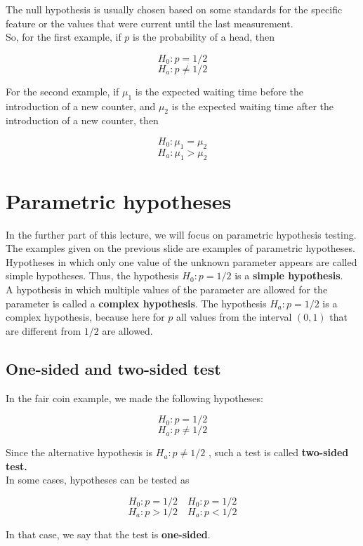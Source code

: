 \documentclass[a4paper, 12pt]{article}
\begin{document}
The null hypothesis is usually chosen based on some standards for the specific feature or the values that were current until the last measurement.\\


So, for the first example, if $p$ is the probability of a head, then

\[H_0: p=1/2\]
\[H_a: p\neq1/2\]

For the second example, if $\mu_1$ is the expected waiting time before the introduction of a new counter, and $\mu_2$ is the expected waiting time after the introduction of a new counter, then

\[H_0: \mu_1 = \mu_2\]
\[H_a: \mu_1 > \mu_2\]


\section{Parametric hypotheses}

In the further part of this lecture, we will focus on parametric hypothesis testing. The examples given on the previous slide are examples of parametric hypotheses.\\


Hypotheses in which only one value of the unknown parameter appears are called simple hypotheses. Thus, the hypothesis $H_0: p = 1/2$ is a \textbf{simple hypothesis}.\\


A hypothesis in which multiple values of the parameter are allowed for the parameter is called a \textbf{complex hypothesis}. The hypothesis $H_a: p = 1/2$ is a complex hypothesis, because here for $p$ all values from the interval $(0,1)$ that are different from $1/2$ are allowed.

\subsection{One-sided and two-sided test}

In the fair coin example, we made the following hypotheses:

\[H_0: p=1/2\]
\[H_a: p\neq1/2\]

Since the alternative hypothesis is  $H_a: p\neq1/2$ , such a test is called \textbf{two-sided test.} \\

In some cases, hypotheses can be tested as


\[H_0: p=1/2 \quad  H_0: p = 1/2 \]
\[H_a: p > 1/2 \quad  H_a: p<1/2\]

In that case, we say that the test is \textbf{one-sided}.\\
\end{document}
